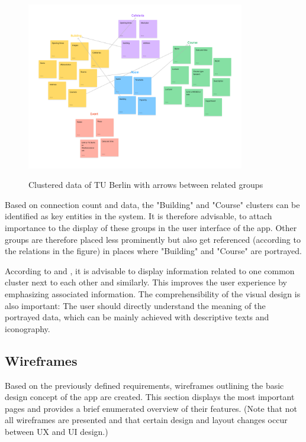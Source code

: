 \begin{figure}[H]
	\centering
	\includegraphics[width=0.85\textwidth]{images/information_clustering.png}\\
	\caption{Clustered data of TU Berlin with arrows between related groups}
\end{figure}

Based on connection count and data, the "Building" and "Course" clusters can be identified as key entities in the system. It is therefore advisable, to attach importance to the display of these groups in the user interface of the app. Other groups are therefore placed less prominently but also get referenced (according to the relations in the figure) in places where "Building" and "Course" are portrayed.

According to \cite{law_of_common_region} and \cite{law_of_similarity}, it is advisable to display information related to one common cluster next to each other and similarly. This improves the user experience by emphasizing associated information. The comprehensibility of the visual design is also important: The user should directly understand the meaning of the portrayed data, which can be mainly achieved with descriptive texts and iconography.

\subsection{Wireframes}
Based on the previously defined requirements, wireframes outlining the basic design concept of the app are created. This section displays the most important pages and provides a brief enumerated overview of their features. (Note that not all wireframes are presented and that certain design and layout changes occur between UX and UI design.)

